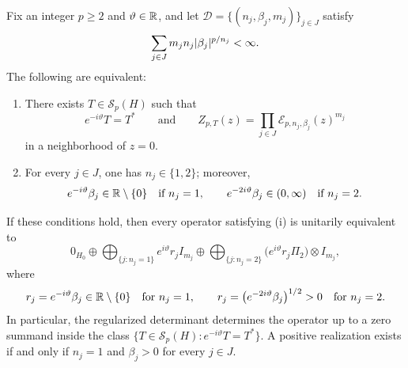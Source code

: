 \begin{theorem}
  \label{thm:line-rigidity-schatten}
  Fix an integer \(p\ge 2\) and \(\vartheta\in\mathbb{R}\), and let
  \(
    \mathcal D=\{(n_j,\beta_j,m_j)\}_{j\in J}
  \)
  satisfy
  \[
    \sum_{j\in J}m_jn_j\lvert \beta_j \rvert^{p/n_j}<\infty.
  \]
  The following are equivalent:
  \begin{enumerate}[label=\textup{(\roman*)}]
    \item There exists \(T\in \mathcal S_p(H)\) such that
      \[
        e^{-i\vartheta}T=T^*
        \qquad\text{and}\qquad
        Z_{p,T}(z)
        =\prod_{j\in J}\mathcal E_{p,n_j,\beta_j}(z)^{m_j}
      \]
      in a neighborhood of \(z=0\).
    \item For every \(j\in J\), one has \(n_j\in\{1,2\}\); moreover,
      \[
        e^{-i\vartheta}\beta_j\in \mathbb{R}\setminus\{0\}
        \quad\text{if } n_j=1,
        \qquad
        e^{-2i\vartheta}\beta_j\in (0,\infty)
        \quad\text{if } n_j=2.
      \]
  \end{enumerate}
  If these conditions hold, then every operator satisfying
  \textup{(i)} is unitarily equivalent to
  \[
    0_{H_0}\oplus
    \bigoplus_{\{j:n_j=1\}}
      e^{i\vartheta}r_j I_{m_j}
    \oplus
    \bigoplus_{\{j:n_j=2\}}
      \bigl(e^{i\vartheta}r_j\Pi_2\bigr)\otimes I_{m_j},
  \]
  where
  \[
    r_j=e^{-i\vartheta}\beta_j\in \mathbb{R}\setminus\{0\}
    \quad\text{for } n_j=1,
    \qquad
    r_j=\bigl(e^{-2i\vartheta}\beta_j\bigr)^{1/2}>0
    \quad\text{for } n_j=2.
  \]
  In particular, the regularized
  determinant determines the operator up to a zero summand inside the
  class
  \(
    \{T\in \mathcal S_p(H):e^{-i\vartheta}T=T^*\}.
  \)
  A positive realization exists if and only if \(n_j=1\) and
  \(\beta_j>0\) for every \(j\in J\).
\end{theorem}

